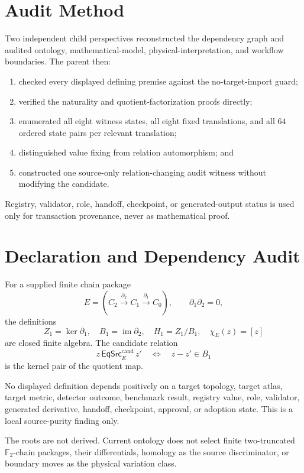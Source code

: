 \documentclass[11pt]{article}
\newcommand{\Ftwo}{\mathbb F_2}
\newcommand{\EqCand}{\mathsf{EqSrc}^{\mathrm{cand}}}
\begin{document}
\section{Audit Method}

Two independent child perspectives reconstructed the dependency graph and
audited ontology, mathematical-model, physical-interpretation, and workflow
boundaries. The parent then:
\begin{enumerate}[leftmargin=*]
  \item checked every displayed defining premise against the no-target-import
  guard;
  \item verified the naturality and quotient-factorization proofs directly;
  \item enumerated all eight witness states, all eight fixed translations, and
  all \(64\) ordered state pairs per relevant translation;
  \item distinguished value fixing from relation automorphism; and
  \item constructed one source-only relation-changing audit witness without
  modifying the candidate.
\end{enumerate}

Registry, validator, role, handoff, checkpoint, or generated-output status is
used only for transaction provenance, never as mathematical proof.

\section{Declaration and Dependency Audit}

For a supplied finite chain package
\[
E=(C_2\xrightarrow{\partial_2}C_1\xrightarrow{\partial_1}C_0),
\qquad \partial_1\partial_2=0,
\]
the definitions
\[
Z_1=\ker\partial_1,\quad B_1=\operatorname{im}\partial_2,\quad
H_1=Z_1/B_1,\quad \chi_E(z)=[z]
\]
are closed finite algebra. The candidate relation
\[
z\,\EqCand_E\,z'\quad\Longleftrightarrow\quad z-z'\in B_1
\]
is the kernel pair of the quotient map.

No displayed definition depends positively on a target topology, target atlas,
target metric, detector outcome, benchmark result, registry value, role,
validator, generated derivative, handoff, checkpoint, approval, or adoption
state. This is a local source-purity finding only.

The roots are not derived. Current ontology does not select finite
two-truncated \(\Ftwo\)-chain packages, their differentials, homology as the
source discriminator, or boundary moves as the physical variation class.
\end{document}
